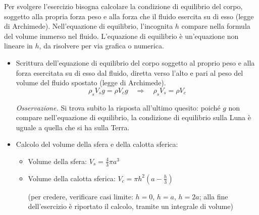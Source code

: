 \parttwo
Per svolgere l'esercizio bisogna calcolare la condizione di equilibrio del corpo, soggetto alla propria forza peso e alla forza che il fluido esercita su di esso (legge di Archimede). Nell'equazione di equilibrio, l'incognita $h$ compare nella formula del volume immerso nel fluido. L'equazione di equilibrio è un'equazione non lineare in $h$, da risolvere per via grafica
o numerica.
\begin{itemize}
  \item Scrittura dell'equazione di equilibrio del corpo soggetto al proprio peso e alla forza esercitata su di esso dal fluido, diretta verso
  l'alto e pari al peso del volume del fluido spostato (legge di Archimede).
    \begin{equation}\label{eqn:equil_archimede}
      \rho_s V_s g = \rho V_c g \quad\Rightarrow\quad \rho_s V_s = \rho V_c
    \end{equation}
    
  \textit{Osservazione.} Si trova subito la risposta all'ultimo quesito: poiché $g$ non compare nell'equazione di equilibrio, la condizione di equilibrio sulla Luna è uguale a quella che si ha sulla Terra.
  \item Calcolo del volume della sfera e della calotta sferica:

   \begin{itemize}    
     \item Volume della sfera: $V_s = \frac{4}{3}\pi a^3$ %
    
     \item Volume della calotta sferica: $V_c = \pi h^2 (a - \frac{h}{3})$
     
      (per credere, verificare casi limite: $h=0$, $h=a$, $h=2a$; alla fine dell'esercizio è riportato il calcolo, tramite un integrale di volume)
    \end{itemize}
    

\end{itemize}

